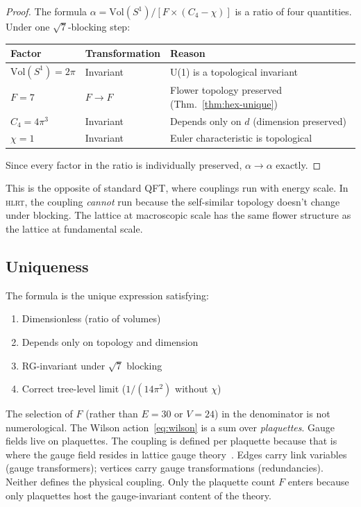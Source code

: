 \documentclass[12pt,a4paper]{article}
\theoremstyle{plain}
\theoremstyle{definition}
\newcommand{\HLRT}{\textsc{hlrt}}
\begin{document}
\begin{proof}
The formula $\alpha = \mathrm{Vol}(S^1)/[F \times (C_4 - \chi)]$ is a ratio of four quantities. Under one $\sqrt{7}$-blocking step:

\begin{center}
\begin{tabular}{lll}
\toprule
\textbf{Factor} & \textbf{Transformation} & \textbf{Reason} \\
\midrule
$\mathrm{Vol}(S^1) = 2\pi$ & Invariant & U(1) is a topological invariant \\
$F = 7$ & $F \to F$ & Flower topology preserved (Thm.~\ref{thm:hex-unique}) \\
$C_4 = 4\pi^3$ & Invariant & Depends only on $d$ (dimension preserved) \\
$\chi = 1$ & Invariant & Euler characteristic is topological \\
\bottomrule
\end{tabular}
\end{center}

Since every factor in the ratio is individually preserved, $\alpha \to \alpha$ exactly. \qedhere
\end{proof}

This is the opposite of standard QFT, where couplings run with energy scale. In \HLRT{}, the coupling \emph{cannot} run because the self-similar topology doesn't change under blocking. The lattice at macroscopic scale has the same flower structure as the lattice at fundamental scale.

\subsection{Uniqueness}

The formula is the unique expression satisfying:
\begin{enumerate}[nosep, label=(\alph*)]
    \item Dimensionless (ratio of volumes)
    \item Depends only on topology and dimension
    \item RG-invariant under $\sqrt{7}$ blocking
    \item Correct tree-level limit ($1/(14\pi^2)$ without $\chi$)
\end{enumerate}

The selection of $F$ (rather than $E = 30$ or $V = 24$) in the denominator is not numerological. The Wilson action~\eqref{eq:wilson} is a sum over \emph{plaquettes}. Gauge fields live on plaquettes. The coupling is defined per plaquette because that is where the gauge field resides in lattice gauge theory~\cite{Wilson1974, Creutz1983}. Edges carry link variables (gauge transformers); vertices carry gauge transformations (redundancies). Neither defines the physical coupling. Only the plaquette count $F$ enters because only plaquettes host the gauge-invariant content of the theory.
\end{document}
